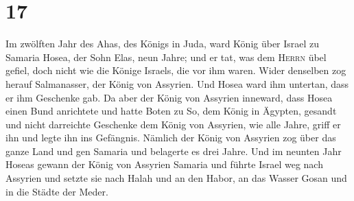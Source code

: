 \hypertarget{section-16}{%
\section{17}\label{section-16}}

 Im zwölften Jahr des Ahas, des Königs in Juda, ward König
über Israel zu Samaria Hosea, der Sohn Elas, neun Jahre; 
und er tat, was dem \textsc{Herrn} übel gefiel, doch nicht wie die
Könige Israels, die vor ihm waren.  Wider denselben zog
herauf Salmanasser, der König von Assyrien. Und Hosea ward ihm untertan,
dass er ihm Geschenke gab.  Da aber der König von Assyrien
inneward, dass Hosea einen Bund anrichtete und hatte Boten zu So, dem
König in Ägypten, gesandt und nicht darreichte Geschenke dem König von
Assyrien, wie alle Jahre, griff er ihn und legte ihn ins Gefängnis.
 Nämlich der König von Assyrien zog über das ganze Land
und gen Samaria und belagerte es drei Jahre.  Und im
neunten Jahr Hoseas gewann der König von Assyrien Samaria und führte
Israel weg nach Assyrien und setzte sie nach Halah und an den Habor, an
das Wasser Gosan und in die Städte der Meder.

